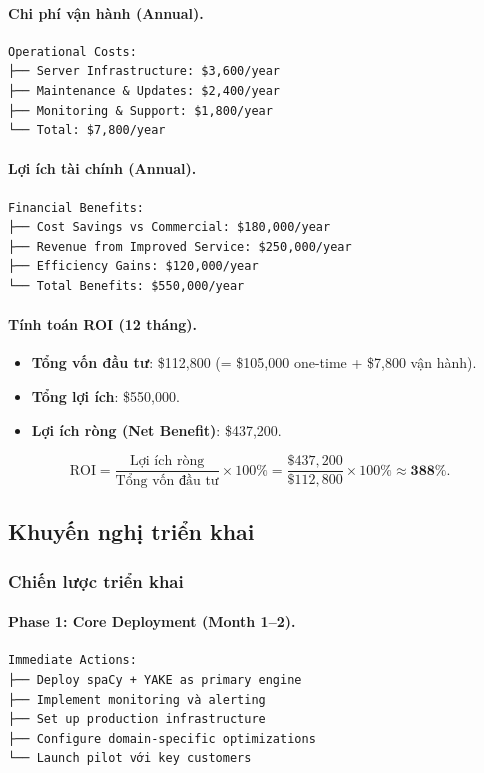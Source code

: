 \paragraph{Chi phí vận hành (Annual).}
\begin{verbatim}
Operational Costs:
├── Server Infrastructure: $3,600/year
├── Maintenance & Updates: $2,400/year
├── Monitoring & Support: $1,800/year
└── Total: $7,800/year
\end{verbatim}

\paragraph{Lợi ích tài chính (Annual).}
\begin{verbatim}
Financial Benefits:
├── Cost Savings vs Commercial: $180,000/year
├── Revenue from Improved Service: $250,000/year
├── Efficiency Gains: $120,000/year
└── Total Benefits: $550,000/year
\end{verbatim}

\paragraph{Tính toán ROI (12 tháng).}
\begin{itemize}
  \item \textbf{Tổng vốn đầu tư}: \$112{,}800 \; (=\; \$105{,}000 one-time + \$7{,}800 vận hành).
  \item \textbf{Tổng lợi ích}: \$550{,}000.
  \item \textbf{Lợi ích ròng (Net Benefit)}: \$437{,}200.
\end{itemize}

\[
\mathrm{ROI} = \frac{\text{Lợi ích ròng}}{\text{Tổng vốn đầu tư}} \times 100\%
= \frac{\$437{,}200}{\$112{,}800} \times 100\% \approx \mathbf{388\%}.
\]

\subsection{Khuyến nghị triển khai}

\subsubsection{Chiến lược triển khai}

\paragraph{Phase 1: Core Deployment (Month 1--2).}
\begin{verbatim}
Immediate Actions:
├── Deploy spaCy + YAKE as primary engine
├── Implement monitoring và alerting
├── Set up production infrastructure
├── Configure domain-specific optimizations
└── Launch pilot với key customers
\end{verbatim}

